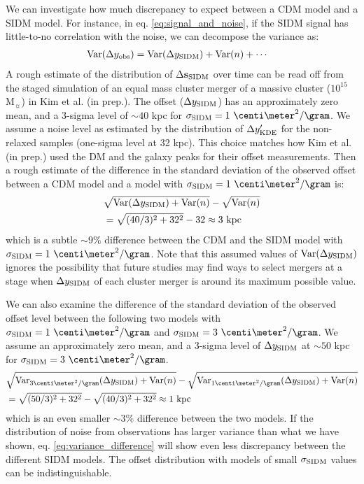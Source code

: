 We can investigate how much discrepancy to expect between a CDM model 
and a SIDM model. 
For instance, in eq. \ref{eq:signal_and_noise},
if the SIDM signal has little-to-no correlation with the noise, 
we can decompose the variance as:
\begin{align}
	\mathrm{Var}(\Delta y_{\rm obs}) &= \mathrm{Var}(\Delta y_{\rm SIDM}) + \mathrm{Var}(n) + \cdots
\end{align}
A rough estimate of the distribution of $\Delta {\bf s}_{\rm SIDM}$ over time 
can be read off from the staged simulation of an equal mass cluster merger of a
massive cluster ($10^{15}$ M$_\sun$) in Kim et al. (in prep.).
The offset ($\Delta y_{\rm SIDM}$) has an approximately zero mean, and a 3-sigma level of
$\sim 40$ kpc for $\sigma_\SIDM = 1~\centi\meter^2 / \gram$.  
We assume a noise level as estimated by the distribution of $\Delta y_{\rm KDE}'$
for the non-relaxed samples (one-sigma level at 32 kpc). This choice matches 
how Kim et al. (in prep.) used the DM and the galaxy peaks for their
offset measurements. 
Then a rough estimate of the difference in the standard deviation of the observed offset 
between a CDM
model and a model with $\sigma_\SIDM = 1~\centi\meter^2 / \gram$ is:
\begin{align}
&	\sqrt{\mathrm{Var}(\Delta y_{\rm SIDM}) + \mathrm{Var}(n)} - \sqrt{\mathrm{Var}(n)} \\ 
&=	\sqrt{(40 / 3)^2 + 32^2} - 32 \approx 3~\mathrm{kpc} 
\end{align}
which is a subtle $\sim 9 \%$ difference between the CDM and the SIDM model with
$\sigma_\SIDM = 1~\centi \meter^2 / \gram$. 
Note that this assumed values of $\mathrm{Var}(\Delta y_{\rm SIDM})$  
ignores the possibility
that future studies may find ways to select mergers at a stage when $\Delta y_{\rm SIDM}$
of each cluster merger is around its maximum possible value. 

We can also examine the difference of the standard deviation of the observed
offset level between the following two models with 
$\sigma_\SIDM =1~\centi\meter^2 / \gram$ and  $\sigma_\SIDM = 3~\centi\meter^2 / \gram$.
We assume an approximately zero mean, and a 3-sigma level of $\Delta y_{\rm SIDM}$
at $\sim 50$ kpc for $\sigma_\SIDM =
3~\centi\meter^2 / \gram$.
\begin{align}
&\sqrt{\Var_{3\centi\meter^2/\gram}(\Delta y_\SIDM) + \Var(n)} -
\sqrt{\Var_{1\centi\meter^2/\gram}(\Delta y_{\SIDM}) +\Var(n)}\label{eq:variance_difference}\\ 
&=\sqrt{(50 / 3)^2 + 32^2} - \sqrt{(40 / 3)^2 + 32^2} \approx 1~\mathrm{kpc} 
\end{align}
which is an even smaller $\sim 3\%$ difference between the two models. 
If the distribution of noise from observations has larger variance than what we
have shown, eq. \ref{eq:variance_difference} will show even less discrepancy
between the different SIDM models. 
The offset distribution with models of small $\sigma_{\rm SIDM}$ values 
can be indistinguishable.  

